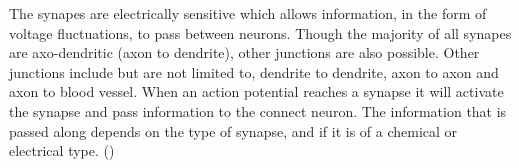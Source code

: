 \documentclass[altfont, fleqn]{uiophd}
\begin{document}
The synapes are electrically sensitive which allows 
information,
in the form of voltage fluctuations, 
to pass between neurons. 
Though the majority of all synapes are axo-dendritic 
(axon to dendrite),
other junctions are also possible.
Other junctions include but are not limited to,
dendrite to dendrite, 
axon to axon and 
axon to blood vessel. 
When an action potential reaches a synapse it will activate
the synapse and pass information to the connect neuron. 
The information that is passed along depends on the type of synapse,
and if it is of a chemical or electrical type.
(\textcite{sterratt_principles_2011})



\end{document}
